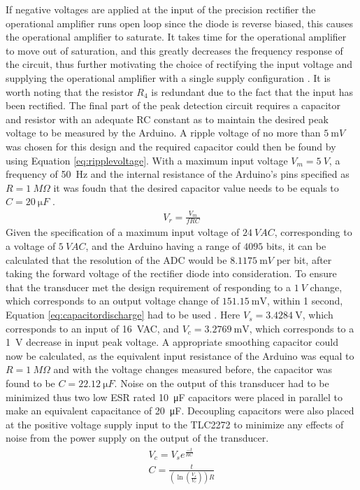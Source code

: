 If negative voltages are applied at the input of the precision rectifier the operational amplifier runs open loop since the diode is reverse biased, this causes the operational amplifier to saturate. It takes time for the operational amplifier to move out of saturation, and this greatly decreases the frequency response of the circuit, thus further motivating the choice of rectifying the input voltage and supplying the operational amplifier with a single supply configuration \cite{PrecisionRectifierSaturation}. It is worth noting that the resistor $R_4$ is redundant due to the fact that the input has been rectified. \vspace{4mm} \newline
The final part of the peak detection circuit requires a capacitor and resistor with an adequate RC constant as to maintain the desired peak voltage to be measured by the Arduino. A ripple voltage of no more than $\SI{5}{\milli V}$ was chosen for this design and the required capacitor could then be found by using Equation \ref{eq:ripplevoltage}. With a maximum input voltage $V_{m}=\SI{5}{V}$, a frequency of \SI{50}{Hz} and the internal resistance of the Arduino's pins specified as $R=\SI{1}{M\Omega}$ it was foudn that the desired capacitor value needs to be equals to $C=\SI{20}{\micro F}$ \cite{Neaman:2018}.\newline
\begin{align}
  V_{r} = \frac{V_{m}}{fRC} 
   \label{eq:ripplevoltage}
\end{align}
Given the specification of a maximum input voltage of $\SI{24}{VAC}$, corresponding to a voltage of $\SI{5}{VAC}$, and the Arduino having a range of $4095$ bits, it can be calculated that the resolution of the ADC would be $\SI{8.1175}{\milli V}$ per bit, after taking the forward voltage of the rectifier diode into consideration. To ensure that the transducer met the design requirement of responding to a $\SI{1}{V}$ change, which corresponds to an output voltage change of $\SI{151.15}{\milli \volt}$, within 1 second, Equation \ref{eq:capacitordischarge} had to be used \cite{CapacitorDischarge}. Here $V_{s}=\SI{3.4284}{\volt}$, which corresponds to an input of \SI{16}{VAC}, and $V_{c}=\SI{3.2769}{\milli \volt}$, which corresponds to a \SI{1}{V} decrease in input peak voltage. A appropriate smoothing capacitor could now be calculated, as the equivalent input resistance of the Arduino was equal to $R=\SI{1}{M \Omega}$ and with the voltage changes measured before, the capacitor was found to be $C=\SI{22.12}{\micro F}$. Noise on the output of this transducer had to be minimized thus two low ESR rated \SI{10}{\micro F} capacitors were placed in parallel to make an equivalent capacitance of \SI{20}{\micro F}. Decoupling capacitors were also placed at the positive voltage supply input to the TLC2272 to minimize any effects of noise from the power supply on the output of the transducer.
\begin{align}
  V_{c} = V_{s}e^{\frac{-t}{RC}} \nonumber \\
  C = \frac{t}{(\ln(\frac{V_{s}}{V_{c}}))R} \label{eq:capacitordischarge}
\end{align}

